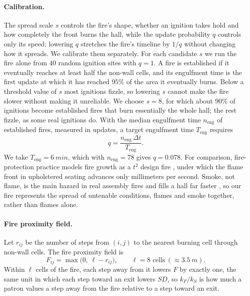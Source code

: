 \documentclass[14pt]{article}
\theoremstyle{definition}
\begin{document}
\paragraph{Calibration.}\label{sec:fire_calibration} The spread scale $s$ controls the
fire's shape, whether an ignition takes hold and how completely the front burns the
hall, while the update probability $q$ controls only its speed: lowering $q$ stretches
the fire's timeline by $1/q$ without changing how it spreads. We calibrate them
separately. For each candidate $s$ we run the fire alone from $40$ random ignition
sites with $q = 1$. A fire is established if it eventually reaches at least half the
non-wall cells, and its engulfment time is the first update at which it has reached
$95\%$ of the area it eventually burns. Below a threshold value of $s$ most ignitions
fizzle, so lowering $s$ cannot make the fire slower without making it unreliable. We
choose $s = 8$, for which about $90\%$ of ignitions become established fires that
burn essentially the whole hall; the rest fizzle, as some real ignitions do. With the
median engulfment time $n_{\text{eng}}$ of established fires, measured in updates, a
target engulfment time $T_{\text{eng}}$ requires
\begin{equation}\label{eq:fire_q}
  q = \frac{n_{\text{eng}}\, \Delta t}{T_{\text{eng}}}.
\end{equation}
We take $T_{\text{eng}} = \SI{6}{min}$, which with $n_{\text{eng}} = 78$ gives
$q = 0.078$. For comparison, fire-protection practice models fire growth as a $t^2$
design fire \cite{sfpe}, under which the flame front in upholstered seating advances
only millimeters per second. Smoke, not flame, is the main hazard in real assembly
fires and fills a hall far faster \cite{sfpe}, so our fire represents the spread of
untenable conditions, flames and smoke together, rather than flames alone.

\paragraph{Fire proximity field.} Let $r_{ij}$ be the number of steps from $(i,j)$ to
the nearest burning cell through non-wall cells. The fire proximity field is
\begin{equation}\label{eq:fire_field}
  F_{ij} = \max\bigl(0,\ \ell - r_{ij}\bigr), \qquad \ell = 8 \text{ cells}
  \ (\approx \SI{3.5}{m}).
\end{equation}
Within $\ell$ cells of the fire, each step away from it lowers $F$ by exactly one, the
same unit in which each step toward an exit lowers $SD$, so $k_F / k_S$ is how much a
patron values a step away from the fire relative to a step toward an exit.
\end{document}
